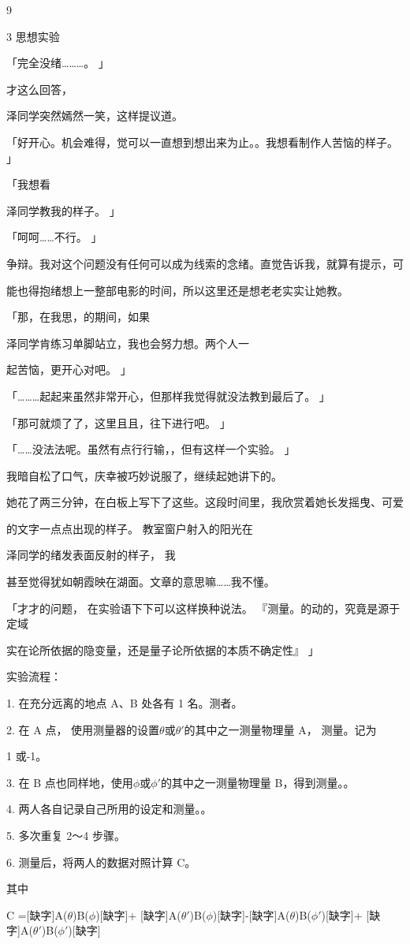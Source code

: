9\par
3 思想实验\par
「完全没绪………。 」\par
才这么回答，\par
泽同学突然嫣然一笑，这样提议道。\par
「好开心。机会难得，觉可以一直想到想出来为止。。我想看制作人苦恼的样子。 」\par
「我想看\par
泽同学教我的样子。 」\par
「呵呵……不行。 」\par
争辩。我对这个问题没有任何可以成为线索的念绪。直觉告诉我，就算有提示，可\par
能也得抱绪想上一整部电影的时间，所以这里还是想老老实实让她教。\par
「那，在我思，的期间，如果\par
泽同学肯练习单脚站立，我也会努力想。两个人一\par
起苦恼，更开心对吧。 」\par
「………起起来虽然非常开心，但那样我觉得就没法教到最后了。 」\par
「那可就烦了了，这里且且，往下进行吧。 」\par
「……没法法呢。虽然有点行行输，，但有这样一个实验。 」\par
我暗自松了口气，庆幸被巧妙说服了，继续起她讲下的。\par
她花了两三分钟，在白板上写下了这些。这段时间里，我欣赏着她长发摇曳、可爱\par
的文字一点点出现的样子。 教室窗户射入的阳光在\par
泽同学的绪发表面反射的样子， 我\par
甚至觉得犹如朝霞映在湖面。文章的意思嘛……我不懂。\par
「才才的问题， 在实验语下下可以这样换种说法。 『测量。的动的，究竟是源于定域\par
实在论所依据的隐变量，还是量子论所依据的本质不确定性』 」\par
实验流程：\par
1. 在充分远离的地点 A、B 处各有 1 名。测者。\par
2. 在 A 点， 使用测量器的设置$\theta$或$\theta$$\prime$的其中之一测量物理量 A， 测量。记为\par
1 或-1。\par
3. 在 B 点也同样地，使用$\phi$或$\phi$$\prime$的其中之一测量物理量 B，得到测量。。\par
4. 两人各自记录自己所用的设定和测量。。\par
5. 多次重复 2～4 步骤。\par
6. 测量后，将两人的数据对照计算 C。\par
其中\par
C =[缺字]A($\theta$)B($\phi$)[缺字]+ [缺字]A($\theta$$\prime$)B($\phi$)[缺字]-[缺字]A($\theta$)B($\phi$$\prime$)[缺字]+ [缺字]A($\theta$$\prime$)B($\phi$$\prime$)[缺字]\par

